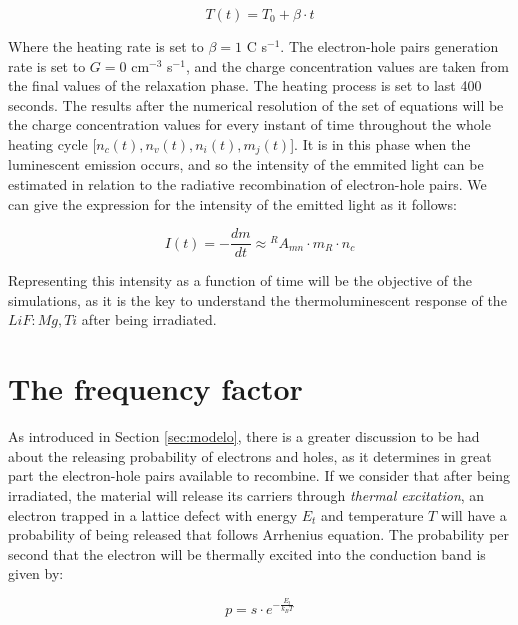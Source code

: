 \begin{equation} \label{eq:heating}
  T(t) = T_0 + \beta \cdot t
\end{equation}

\vspace{7pt}
Where the heating rate is set to $\beta = 1 $ \textdegree C s$^{-1}$. The electron-hole pairs generation rate is set to $G = 0$ cm$^{-3}$ s$^{-1}$, and the charge concentration values are taken from the final values of the relaxation phase. The heating process is set to last 400 seconds. The results after the numerical resolution of the set of equations will be the charge concentration values for every instant of time throughout the whole heating cycle [$n_c(t), n_v(t), n_i(t), m_j(t)$]. It is in this phase when the luminescent emission occurs, and so the intensity of the emmited light can be estimated in relation to the radiative recombination of electron-hole pairs. We can give the expression for the intensity of the emitted light as it follows:

\begin{equation} \label{eq:intensity}
  I(t) = -\frac{dm}{dt} \approx {}^RA_{mn} \cdot m_R \cdot n_c
\end{equation}

\vspace{7pt}
Representing this intensity as a function of time will be the objective of the simulations, as it is the key to understand the thermoluminescent response of the $LiF:M\!g,Ti$ after being irradiated.

\section{The frequency factor} \label{sec:factorfrecuencia}

As introduced in Section \ref{sec:modelo}, there is a greater discussion to be had about the releasing probability of electrons and holes, as it determines in great part the electron-hole pairs available to recombine. If we consider that after being irradiated, the material will release its carriers through \textit{thermal excitation}, an electron trapped in a lattice defect with energy $E_t$ and temperature $T$ will have a probability of being released that follows Arrhenius equation. The probability per second that the electron will be thermally excited into the conduction band is given by:

\begin{equation}
  p = s \cdot e^{-\frac{E_t}{k_B T}}
\end{equation}

